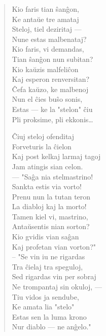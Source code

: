 \begin{verse}
\asterism{}

                        Kio faris tian \^san\^gon,\\
                        Ke anta\u ue tre amataj\\
                        Steloj, tiel deziritaj ---\\
                        Nune estas malbenataj?\\
                        Kio faris, vi demandas,\\
                        Tian \^san\^gon nun subitan?\\
                        Kio ka\u uzis malfeli\^con\\
                        Kaj esperon renversitan?\\
                        \^Cefa ka\u uzo, ke malbenoj\\
                        Nun el \^cies bu\^so sonis,\\
                        Estas --- ke la "stelon" \^ciu\\
                        Pli proksime, pli ekkonis\dots

\asterism{}

                        \^Ciuj steloj ofenditaj\\
                        Forveturis la \^cielon\\
                        Kaj post kelkaj larmaj tagoj\\
                        Jam atingis sian celon.\\
                        --- "Sa\^ga nia stelmastrino!\\
                        Sankta estis via vorto!\\
                        Prenu nun la tutan teron\\
                        La diabloj kaj la morto!\\
                        Tamen kiel vi, mastrino,\\
                        Anta\u usentis nian sorton?\\
                        Kio gvidis vian sa\^gan\\
                        Kaj profetan vian vorton?"\\
                        -- "Se vin iu ne rigardas\\
                        Tra \^cielaj tra speguloj,\\
                        Sed rigardas vin per sobraj\\
                        Ne trompantaj sin okuloj, ---\\
                        Tiu vidos ja sendube,\\
                        Ke amata lia "stelo"\\
                        Estas sen la luma krono\\
                        Nur diablo --- ne an\^gelo."

\end{verse}

\smallrule{}
